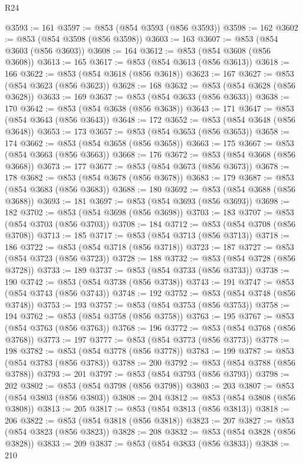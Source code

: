 \begin{lexlean}{R24}
\begin{coremodule}
@3593 := 161
@3597 := @853 (@854 @3593 (@856 @3593))
@3598 := 162
@3602 := @853 (@854 @3598 (@856 @3598))
@3603 := 163
@3607 := @853 (@854 @3603 (@856 @3603))
@3608 := 164
@3612 := @853 (@854 @3608 (@856 @3608))
@3613 := 165
@3617 := @853 (@854 @3613 (@856 @3613))
@3618 := 166
@3622 := @853 (@854 @3618 (@856 @3618))
@3623 := 167
@3627 := @853 (@854 @3623 (@856 @3623))
@3628 := 168
@3632 := @853 (@854 @3628 (@856 @3628))
@3633 := 169
@3637 := @853 (@854 @3633 (@856 @3633))
@3638 := 170
@3642 := @853 (@854 @3638 (@856 @3638))
@3643 := 171
@3647 := @853 (@854 @3643 (@856 @3643))
@3648 := 172
@3652 := @853 (@854 @3648 (@856 @3648))
@3653 := 173
@3657 := @853 (@854 @3653 (@856 @3653))
@3658 := 174
@3662 := @853 (@854 @3658 (@856 @3658))
@3663 := 175
@3667 := @853 (@854 @3663 (@856 @3663))
@3668 := 176
@3672 := @853 (@854 @3668 (@856 @3668))
@3673 := 177
@3677 := @853 (@854 @3673 (@856 @3673))
@3678 := 178
@3682 := @853 (@854 @3678 (@856 @3678))
@3683 := 179
@3687 := @853 (@854 @3683 (@856 @3683))
@3688 := 180
@3692 := @853 (@854 @3688 (@856 @3688))
@3693 := 181
@3697 := @853 (@854 @3693 (@856 @3693))
@3698 := 182
@3702 := @853 (@854 @3698 (@856 @3698))
@3703 := 183
@3707 := @853 (@854 @3703 (@856 @3703))
@3708 := 184
@3712 := @853 (@854 @3708 (@856 @3708))
@3713 := 185
@3717 := @853 (@854 @3713 (@856 @3713))
@3718 := 186
@3722 := @853 (@854 @3718 (@856 @3718))
@3723 := 187
@3727 := @853 (@854 @3723 (@856 @3723))
@3728 := 188
@3732 := @853 (@854 @3728 (@856 @3728))
@3733 := 189
@3737 := @853 (@854 @3733 (@856 @3733))
@3738 := 190
@3742 := @853 (@854 @3738 (@856 @3738))
@3743 := 191
@3747 := @853 (@854 @3743 (@856 @3743))
@3748 := 192
@3752 := @853 (@854 @3748 (@856 @3748))
@3753 := 193
@3757 := @853 (@854 @3753 (@856 @3753))
@3758 := 194
@3762 := @853 (@854 @3758 (@856 @3758))
@3763 := 195
@3767 := @853 (@854 @3763 (@856 @3763))
@3768 := 196
@3772 := @853 (@854 @3768 (@856 @3768))
@3773 := 197
@3777 := @853 (@854 @3773 (@856 @3773))
@3778 := 198
@3782 := @853 (@854 @3778 (@856 @3778))
@3783 := 199
@3787 := @853 (@854 @3783 (@856 @3783))
@3788 := 200
@3792 := @853 (@854 @3788 (@856 @3788))
@3793 := 201
@3797 := @853 (@854 @3793 (@856 @3793))
@3798 := 202
@3802 := @853 (@854 @3798 (@856 @3798))
@3803 := 203
@3807 := @853 (@854 @3803 (@856 @3803))
@3808 := 204
@3812 := @853 (@854 @3808 (@856 @3808))
@3813 := 205
@3817 := @853 (@854 @3813 (@856 @3813))
@3818 := 206
@3822 := @853 (@854 @3818 (@856 @3818))
@3823 := 207
@3827 := @853 (@854 @3823 (@856 @3823))
@3828 := 208
@3832 := @853 (@854 @3828 (@856 @3828))
@3833 := 209
@3837 := @853 (@854 @3833 (@856 @3833))
@3838 := 210

\end{coremodule}
\end{lexlean}
